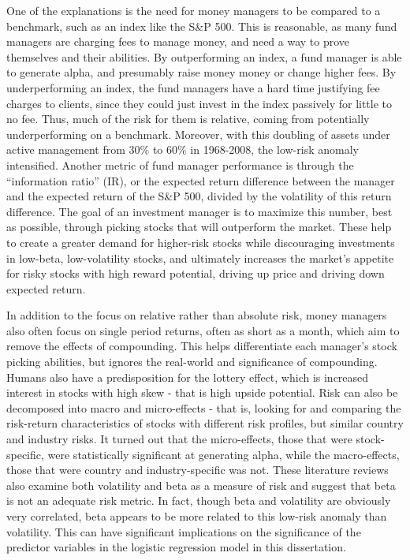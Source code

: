 \documentclass[12pt,twoside]{reedthesis}
\theoremstyle{definition}
\theoremstyle{definition}
\theoremstyle{definition}
\theoremstyle{remark}
\begin{document}
One of the explanations is the need for money managers to be compared to
a benchmark, such as an index like the S\&P 500. This is reasonable, as
many fund managers are charging fees to manage money, and need a way to
prove themselves and their abilities. By outperforming an index, a fund
manager is able to generate alpha, and presumably raise money money or
change higher fees. By underperforming an index, the fund managers have
a hard time justifying fee charges to clients, since they could just
invest in the index passively for little to no fee. Thus, much of the
risk for them is relative, coming from potentially underperforming on a
benchmark. Moreover, with this doubling of assets under active
management from 30\% to 60\% in 1968-2008, the low-risk anomaly
intensified. Another metric of fund manager performance is through the
``information ratio'' (IR), or the expected return difference between
the manager and the expected return of the S\&P 500, divided by the
volatility of this return difference. The goal of an investment manager
is to maximize this number, best as possible, through picking stocks
that will outperform the market. These help to create a greater demand
for higher-risk stocks while discouraging investments in low-beta,
low-volatility stocks, and ultimately increases the market's appetite
for risky stocks with high reward potential, driving up price and
driving down expected return.

In addition to the focus on relative rather than absolute risk, money
managers also often focus on single period returns, often as short as a
month, which aim to remove the effects of compounding. This helps
differentiate each manager's stock picking abilities, but ignores the
real-world and significance of compounding. Humans also have a
predisposition for the lottery effect, which is increased interest in
stocks with high skew - that is high upside potential. Risk can also be
decomposed into macro and micro-effects - that is, looking for and
comparing the risk-return characteristics of stocks with different risk
profiles, but similar country and industry risks. It turned out that the
micro-effects, those that were stock-specific, were statistically
significant at generating alpha, while the macro-effects, those that
were country and industry-specific was not. These literature reviews
also examine both volatility and beta as a measure of risk and suggest
that beta is not an adequate risk metric. In fact, though beta and
volatility are obviously very correlated, beta appears to be more
related to this low-risk anomaly than volatility. This can have
significant implications on the significance of the predictor variables
in the logistic regression model in this dissertation.
\end{document}

